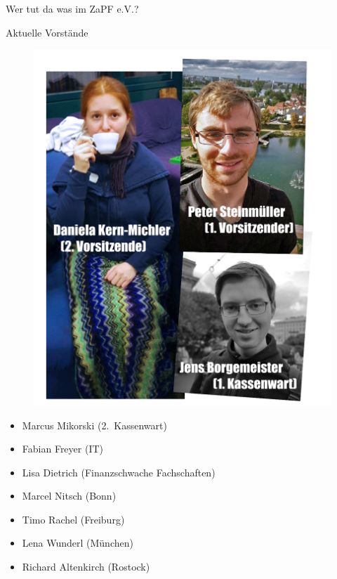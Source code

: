 \documentclass[compress, aspectratio=169]{beamer}
\begin{document}
\begin{frame}{Wer tut da was im ZaPF e.V.?}
  \begin{block}{Aktuelle Vorstände}
    \begin{minipage}{0.5\textwidth}
      \begin{figure}
      \includegraphics[height=.75\textheight]{ZapfeV.png}
      \end{figure}
    \end{minipage}
    \begin{minipage}{0.45\textwidth}
      \begin{itemize}
        \item Marcus Mikorski \mbox{(2. Kassenwart)}
        \item Fabian Freyer (IT)
        \item Lisa Dietrich (Finanzschwache Fachschaften)
        \item Marcel Nitsch (Bonn)
        \item Timo Rachel (Freiburg)
        \item Lena Wunderl (München)
        \item Richard Altenkirch (Rostock)
      \end{itemize}
    \end{minipage}
  \end{block}
\end{frame}
  
\end{document}
